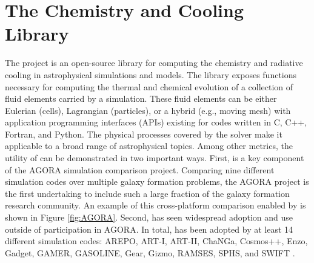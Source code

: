\section{The \grackle{} Chemistry and Cooling Library}

The \grackle{} project
\citep[][\url{https://grackle.readthedocs.io}]{2017MNRAS.466.2217S} is
an open-source library for computing the chemistry and radiative
cooling in astrophysical simulations and models.  The
\grackle{} library exposes functions necessary for computing the
thermal and chemical evolution of a collection of fluid elements carried by a
simulation.  These fluid elements can be either Eulerian (cells),
Lagrangian (particles), or a hybrid (e.g., moving mesh) with
application programming interfaces (APIs)
existing for codes written in C, C++, Fortran, and Python.  The
physical processes covered by the solver make it applicable to a broad
range of astrophysical topics.  Among
other metrics, the utility of \grackle{} can be demonstrated in two
important ways.  First, \grackle{} is a key component of the AGORA
\citep{2014ApJS..210...14K, 2016ApJ...833..202K} simulation comparison
project.  Comparing nine different simulation codes over multiple
galaxy formation problems, the AGORA project is the first
undertaking to include such a large fraction of the galaxy formation research
community.  An example of this cross-platform comparison enabled by
\grackle{} is shown in Figure \ref{fig:AGORA}.  Second, \grackle{} has
seen widespread adoption and use outside of participation in AGORA.
In total, \grackle{} has been adopted by at least 14 different
simulation codes:
AREPO, ART-I, ART-II, ChaNGa, Cosmos++, Enzo, Gadget, GAMER, GASOLINE, Gear,
Gizmo, RAMSES, SPHS, and SWIFT
\citep{2010MNRAS.401..791S, 1999PhDT........25K, 2002ApJ...571..563K,
2008ApJ...672...19R, 2004NewA....9..137W, 2006MNRAS.373.1074S,
2003ApJS..147..177A, 2005ApJ...635..723A, 2014ApJS..211...19B,
2005MNRAS.364.1105S, 2010ApJS..186..457S, 2004NewA....9..137W,
2012A&A...538A..82R, 2012ASPC..453..141R, 2015MNRAS.450...53H,
2002A&A...385..337T, 2012MNRAS.422.3037R, 2013arXiv1309.3783G,
2016arXiv160602738S}.


